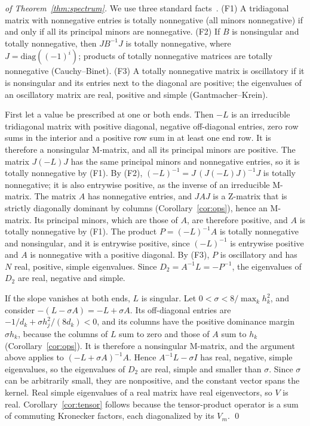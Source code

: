\documentclass[smallextended,envcountsame]{svjour3}
\begin{document}
\begin{proof}[of Theorem~\ref{thm:spectrum}]
We use three standard facts~\cite{gantmacher2002oscillation,fallat2011totally}. (F1) A tridiagonal matrix
with nonnegative entries is totally nonnegative (all minors nonnegative) if and only if all its principal
minors are nonnegative. (F2) If $B$ is nonsingular and totally nonnegative, then $JB^{-1}J$ is totally
nonnegative, where $J=\mathrm{diag}((-1)^i)$; products of totally nonnegative matrices are totally
nonnegative (Cauchy--Binet). (F3) A totally nonnegative matrix is oscillatory if it is nonsingular and its
entries next to the diagonal are positive; the eigenvalues of an oscillatory matrix are real, positive and
simple (Gantmacher--Krein).

First let a value be prescribed at one or both ends. Then $-L$ is an irreducible tridiagonal matrix with
positive diagonal, negative off-diagonal entries, zero row sums in the interior and a positive row sum in at
least one end row. It is therefore a nonsingular M-matrix, and all its principal minors are positive. The
matrix $J(-L)J$ has the same principal minors and nonnegative entries, so it is totally nonnegative by (F1).
By (F2), $(-L)^{-1}=J\,(J(-L)J)^{-1}J$ is totally nonnegative; it is also entrywise positive, as the inverse
of an irreducible M-matrix. The matrix $A$ has nonnegative entries, and $JAJ$ is a Z-matrix that is strictly
diagonally dominant by columns (Corollary~\ref{cor:ops}), hence an M-matrix. Its principal minors, which are
those of $A$, are therefore positive, and $A$ is totally nonnegative by (F1). The product $P=(-L)^{-1}A$ is
totally nonnegative and nonsingular, and it is entrywise positive, since $(-L)^{-1}$ is entrywise positive
and $A$ is nonnegative with a positive diagonal. By (F3), $P$ is oscillatory and has $N$ real, positive,
simple eigenvalues. Since $D_2=A^{-1}L=-P^{-1}$, the eigenvalues of $D_2$ are real, negative and simple.

If the slope vanishes at both ends, $L$ is singular. Let $0<\sigma<8/\max_kh_k^2$, and consider
$-(L-\sigma A)=-L+\sigma A$. Its off-diagonal entries are $-1/d_k+\sigma h_j^2/(8d_k)<0$, and its columns have
the positive dominance margin $\sigma h_k$, because the columns of $L$ sum to zero and those of $A$ sum to
$h_k$ (Corollary~\ref{cor:ops}). It is therefore a nonsingular M-matrix, and the argument above applies to
$(-L+\sigma A)^{-1}A$. Hence $A^{-1}L-\sigma I$ has real, negative, simple eigenvalues, so the eigenvalues of
$D_2$ are real, simple and smaller than $\sigma$. Since $\sigma$ can be arbitrarily small, they are
nonpositive, and the constant vector spans the kernel. Real simple eigenvalues of a real matrix have real
eigenvectors, so $V$ is real. Corollary~\ref{cor:tensor} follows because the tensor-product operator is a
sum of commuting Kronecker factors, each diagonalized by its $V_m$. \qed
\end{proof}
\end{document}
